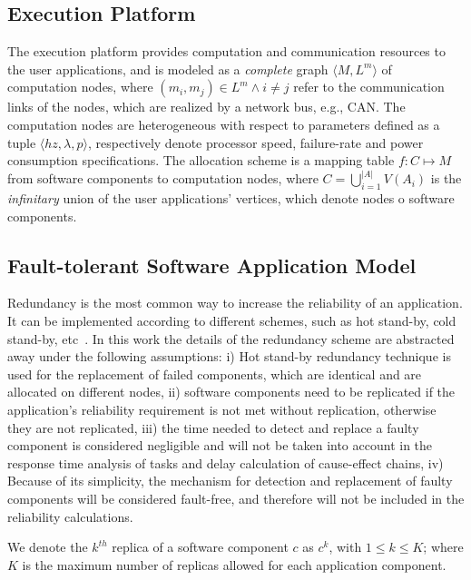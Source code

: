 {\subsection{Execution Platform}
The execution platform provides computation and communication resources to the user applications, and is modeled as a \textit{complete} graph $\langle M,L^m\rangle$ of computation nodes, where $(m_i,m_j)\in L^m \land i\neq j$ refer to the communication links of the nodes, which are realized by a network bus, e.g., CAN. The computation nodes are heterogeneous with respect to parameters defined as a tuple $\langle hz, \lambda, p \rangle$, respectively denote processor speed, failure-rate and power consumption specifications. The allocation scheme is a mapping table $f:C\mapsto M$ from software components to computation nodes, where $C=\bigcup_{i=1}^{|A|} {V(A_i)}$ is the \textit{infinitary} union of the user applications' vertices, which denote nodes o software components.

\subsection{Fault-tolerant Software Application Model}
Redundancy is the most common way to increase the reliability of an application. It can be implemented according to different schemes, such as hot stand-by, cold stand-by, etc~\cite{Dubrova2013Fault-tolerantDesign}. In this work the details of the redundancy scheme are abstracted away under the following assumptions: i) Hot stand-by redundancy technique is used for the replacement of failed components, which are identical and are allocated on different nodes, ii) software components need to be replicated if the application's reliability requirement is not met without replication, otherwise they are not replicated, iii) the time needed to detect and replace a faulty component is considered negligible and will not be taken into account in the response time analysis of tasks and delay calculation of cause-effect chains, iv) Because of its simplicity, the mechanism for detection and replacement of faulty components will be considered fault-free, and therefore will not be included in the reliability calculations.

We denote the $k^{th}$ replica of a software component $c$ as $c^k$, with $1\le k\leq K$; where $K$ is the maximum number of replicas allowed for each application component.

}

